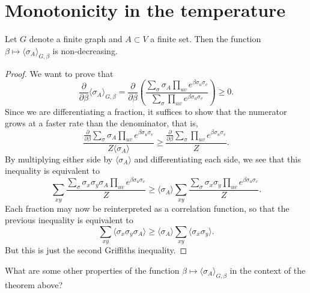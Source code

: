 \section{Monotonicity in the temperature}

\begin{theorem}
    Let $G$ denote a finite graph and $A\subset V$ a finite set.
    Then the function $\beta\mapsto\langle\sigma_A\rangle_{G,\beta}$
    is non-decreasing.
\end{theorem}

\begin{proof}
    We want to prove that
    \[
        \frac{\partial}{\partial\beta}
        \langle\sigma_A\rangle_{G,\beta}
        =
        \frac{\partial}{\partial\beta}
        \left(
            \frac{
                \sum_\sigma\sigma_A\prod_{uv}e^{\beta\sigma_u\sigma_v}
            }{
                \sum_\sigma\prod_{uv}e^{\beta\sigma_u\sigma_v}
            }
        \right)
        \geq 0.
    \]
    Since we are differentiating a fraction,
    it suffices to show that the numerator grows at a faster rate
    than the denominator,
    that is,
    \[
        \frac{\frac{\partial}{\partial\beta}
            \sum_\sigma\sigma_A\prod_{uv}e^{\beta\sigma_u\sigma_v}
        }{
            Z\langle\sigma_A\rangle
        }
        \geq
        \frac{\frac{\partial}{\partial\beta}
            \sum_\sigma\prod_{uv}e^{\beta\sigma_u\sigma_v}
        }{
            Z
        }.
    \]
    By multiplying either side by $\langle\sigma_A\rangle$
    and differentiating each side,
    we see that this inequality is equivalent to
    \[
       \sum_{xy}
        \frac{\sum_\sigma
            \sigma_x\sigma_y\sigma_A\prod_{uv}e^{\beta\sigma_u\sigma_v}
        }{Z}
        \geq
        \langle\sigma_A\rangle
        \sum_{xy}
        \frac{
            \sum_\sigma
            \sigma_x\sigma_y
            \prod_{uv}e^{\beta\sigma_u\sigma_v}
        }{Z}.
    \]
    Each fraction may now be reinterpreted as a correlation function,
    so that the previous inequality is equivalent to
    \[
        \sum_{xy}\langle\sigma_x\sigma_y\sigma_A\rangle
        \geq
        \langle\sigma_A\rangle
        \sum_{xy}\langle\sigma_x\sigma_y\rangle.
    \]
    But this is just the second Griffiths inequality.
\end{proof}

\begin{exercise}
    What are some other properties of the function $\beta\mapsto\langle\sigma_A\rangle_{G,\beta}$
    in the context of the theorem above?
\end{exercise}
